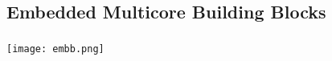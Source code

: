 \subsection{Embedded Multicore Building Blocks}
\begin{frame}
	\frametitle{\secname}
	\framesubtitle{\subsecname}
	
	\texttt{[image: embb.png]}
\end{frame}